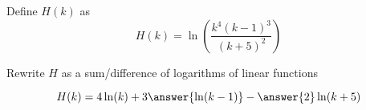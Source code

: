 \documentclass{ximera}
\author{Lee Wayand}
\begin{document}
\begin{exercise}



\begin{question}



Define $H(k)$ as 
\[
H(k) = \ln\left(  \frac{k^4 (k-1)^3}{(k+5)^2}  \right)
\]



Rewrite $H$ as a sum/difference of logarithms of linear functions



\[
H(k) = 4 \ln(k) +  3 \answer{\ln(k-1)} - \answer{2} \ln(k+5)
\]



\end{question}












\end{exercise}
\end{document}
